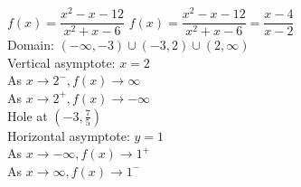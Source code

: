 {$f(x) = \dfrac{x^2-x-12}{x^2+x-6}$}
{$f(x) = \dfrac{x^2-x-12}{x^{2} +x - 6} = \dfrac{x-4}{x - 2}$\\
Domain: $(-\infty, -3) \cup (-3, 2) \cup (2, \infty)$\\
Vertical asymptote: $x = 2$\\
As $x \rightarrow 2^{-}, f(x) \rightarrow \infty$\\
As $x \rightarrow 2^{+}, f(x) \rightarrow -\infty$\\
Hole at $\left(-3, \frac{7}{5} \right)$ \\
Horizontal asymptote: $y = 1$ \\
As $x \rightarrow -\infty, f(x) \rightarrow 1^{+}$\\
As $x \rightarrow \infty, f(x) \rightarrow 1^{-}$}